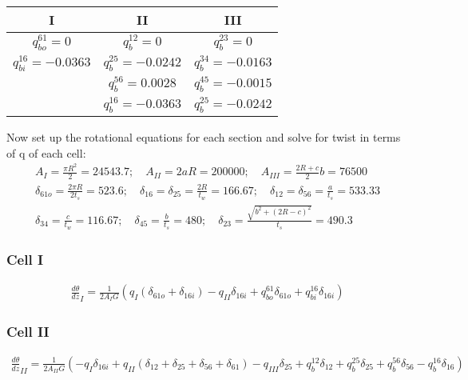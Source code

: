 \documentclass[12 pt]{article}
\begin{document}
\begin{center}
    \begin{tabular}{|c|c|c|}
        \hline
        I & II & III \\
        \hline
        $q_{bo}^{61}=0$ & $q_b^{12}=0$ & $q_b^{23}=0$ \\
        $q_{bi}^{16}=-0.0363$ & $q_b^{25}=-0.0242$ & $q_b^{34}=-0.0163$ \\
        & $q_b^{56}=0.0028$ & $q_b^{45}=-0.0015$ \\
        & $q_b^{16}=-0.0363$ & $q_b^{25}=-0.0242$ \\
        \hline
    \end{tabular}
\end{center}
Now set up the rotational equations for each section and solve for twist in terms of q of each cell:
\begin{align*}
    A_I=\frac{\pi R^2}{2}=24543.7; \quad A_{II}=2aR=200000; \quad A_{III}=\frac{2R+c}{2}b=76500 \\
    \delta_{61o}=\frac{2\pi R}{2t_s}=523.6; \quad \delta_{16}=\delta_{25}=\frac{2R}{t_w}=166.67; \quad
    \delta_{12}=\delta_{56}=\frac{a}{t_s}=533.33 \\
    \delta_{34}=\frac{c}{t_w}=116.67; \quad \delta_{45}=\frac{b}{t_s}=480; \quad
    \delta_{23}=\frac{\sqrt{b^2+(2R-c)^2}}{t_s}=490.3
\end{align*}
\subsubsection*{Cell I}
\begin{align*}
    \frac{d\theta}{dz}_I=\frac{1}{2A_IG}(q_I(\delta_{61o}+\delta_{16i})-q_{II}\delta_{16i}+q_{bo}^{61}\delta_{61o}
    +q_{bi}^{16}\delta_{16i})
\end{align*}
\subsubsection*{Cell II}
\begin{align*}
    \frac{d\theta}{dz}_{II}=\frac{1}{2A_{II}G}(-q_I\delta_{16i}+q_{II}(\delta_{12}+\delta_{25}+\delta_{56}+\delta_{61})
    -q_{III}\delta_{25}+q_b^{12}\delta_{12}+q_b^{25}\delta_{25}+q_b^{56}\delta_{56}-q_b^{16}\delta_{16})
\end{align*}
\end{document}
